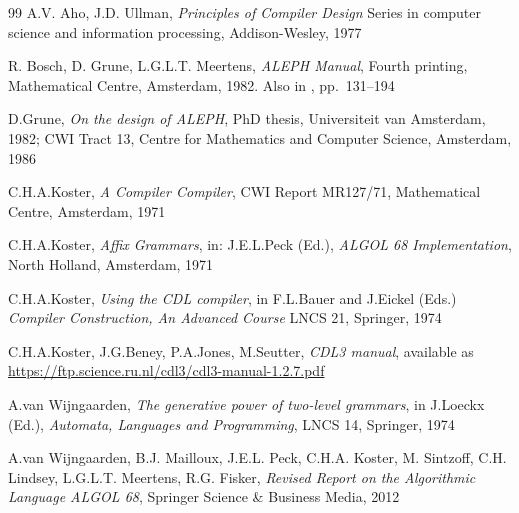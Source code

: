 \documentclass[titlepage]{article}
\begin{document}
\begin{thebibliography}{99}
A.V. Aho, J.D. Ullman,
\emph{Principles of Compiler Design}
Series in computer science and information processing,
Addison-Wesley, 1977

R. Bosch, D. Grune, L.G.L.T. Meertens,
\emph{ALEPH Manual},
Fourth printing, Mathematical Centre, Amsterdam, 1982.
Also in \cite{grune}, pp.~131--194

D.Grune,
\emph{On the design of ALEPH},
PhD thesis, Universiteit van Amsterdam, 1982;
CWI Tract 13, Centre for Mathematics and Computer Science, Amsterdam, 1986

C.H.A.Koster,
\emph{A Compiler Compiler},
CWI Report MR127/71,
Mathematical Centre, Amsterdam, 1971

C.H.A.Koster,
\emph{Affix Grammars}, in:
J.E.L.Peck (Ed.), \emph{ALGOL 68 Implementation}, North Holland, Amsterdam,
1971

C.H.A.Koster,
\emph{Using the CDL compiler}, in
F.L.Bauer and J.Eickel (Eds.) \emph{Compiler Construction, An Advanced Course}
LNCS 21, Springer, 1974

C.H.A.Koster, J.G.Beney, P.A.Jones, M.Seutter,
\emph{CDL3 manual},
available as \url{https://ftp.science.ru.nl/cdl3/cdl3-manual-1.2.7.pdf}

A.van Wijngaarden,
\emph{The generative power of two-level grammars}, in
J.Loeckx (Ed.), \emph{Automata, Languages and Programming},
LNCS 14, Springer, 1974

A.van Wijngaarden, B.J. Mailloux, J.E.L. Peck,
C.H.A.  Koster, M. Sintzoff, C.H. Lindsey, L.G.L.T. Meertens, R.G. Fisker,
\emph{Revised Report on the Algorithmic Language ALGOL 68},
Springer Science \& Business Media, 2012

\end{thebibliography}
\end{document}
